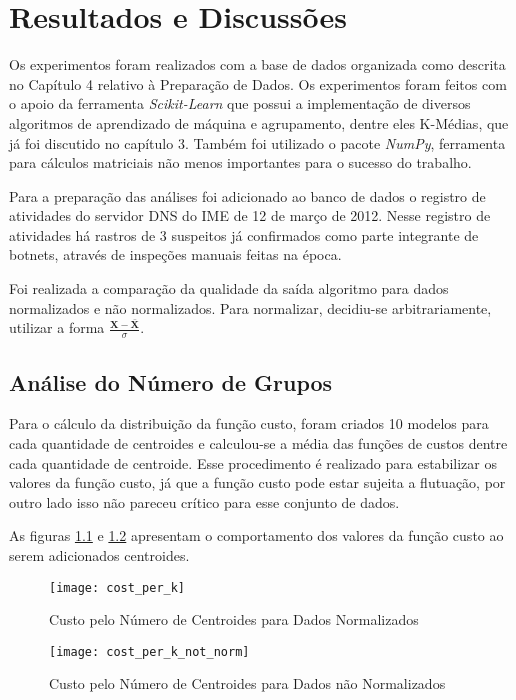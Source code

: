 \chapter{Resultados e Discussões}

Os experimentos foram realizados com a base de dados organizada como descrita no Capítulo 4 relativo à Preparação de Dados. Os experimentos foram feitos com o apoio da ferramenta \textit{Scikit-Learn} que possui a implementação de diversos algoritmos de aprendizado de máquina e agrupamento, dentre eles K-Médias, que já foi discutido no capítulo 3. Também foi utilizado o pacote \textit{NumPy}, ferramenta para cálculos matriciais não menos importantes para o sucesso do trabalho.

Para a preparação das análises foi adicionado ao banco de dados o registro de atividades do servidor DNS do IME de 12 de março de 2012. Nesse registro de atividades há rastros de 3 suspeitos já confirmados como parte integrante de botnets, através de inspeções manuais feitas na época.

Foi realizada a comparação da qualidade da saída algoritmo para dados normalizados e não normalizados. Para normalizar, decidiu-se arbitrariamente, utilizar a forma \(\frac{\mathbf{X} - \mathbf{\bar{X}}}{\sigma} \).

\section{Análise do Número de Grupos}

Para o cálculo da distribuição da função custo, foram criados 10 modelos para cada quantidade de centroides e calculou-se a média das funções de custos dentre cada quantidade de centroide. Esse procedimento é realizado para estabilizar os valores da função custo, já que a função custo pode estar sujeita a flutuação, por outro lado isso não pareceu crítico para esse conjunto de dados.

As figuras \ref{fig:cost_per_k} e \ref{fig:cost_per_k_not_norm} apresentam o comportamento dos valores da função custo ao serem adicionados centroides.

\begin{figure}[htbp]
\centering
\texttt{[image: cost\_per\_k]}
\caption[Custo pelo Número de Centroides para Dados Normalizados]{Custo pelo Número de Centroides para Dados Normalizados} \label{fig:cost_per_k}
\end{figure}

\begin{figure}[htbp]
\centering
\texttt{[image: cost\_per\_k\_not\_norm]}
\caption[Custo pelo Número de Centroides para Dados não Normalizados]{Custo pelo Número de Centroides para Dados não Normalizados} \label{fig:cost_per_k_not_norm}
\end{figure}

